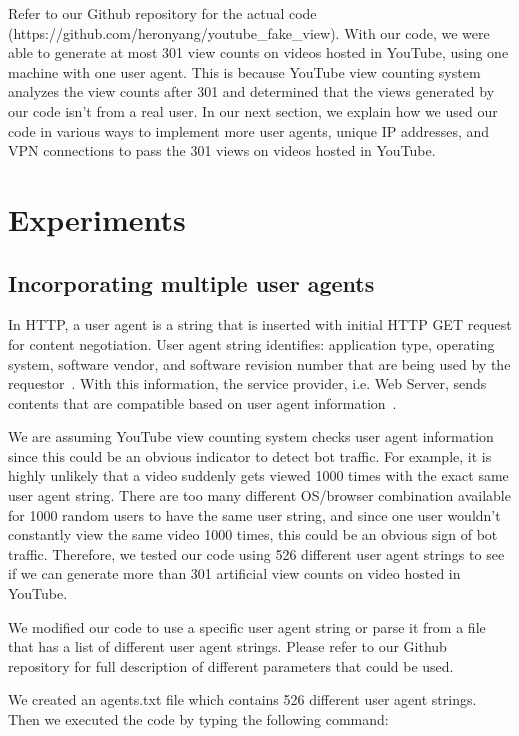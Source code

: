 \documentclass[conference]{IEEEtran}
\begin{document}
Refer to our Github repository for the actual code (https://github.com/heronyang/youtube\_fake\_view). With our code, we were able to generate at most 301 view counts on videos hosted in YouTube, using one machine with one user agent. This is because YouTube view counting system analyzes the view counts after 301 and determined that the views generated by our code isn't from a real user. In our next section, we explain how we used our code in various ways to implement more user agents, unique IP addresses, and VPN connections to pass the 301 views on videos hosted in YouTube.

\section{Experiments}

\subsection{Incorporating multiple user agents}

In HTTP, a user agent is a string that is inserted with initial HTTP GET request for content negotiation. User agent string identifies: application type, operating system, software vendor, and software revision number that are being used by the requestor~\cite{c16}. With this information, the service provider, i.e. Web Server, sends contents that are compatible based on user agent information~\cite{c16}.

We are assuming YouTube view counting system checks user agent information since this could be an obvious indicator to detect bot traffic. For example, it is highly unlikely that a video suddenly gets viewed 1000 times with the exact same user agent string. There are too many different OS/browser combination available for 1000 random users to have the same user string, and since one user wouldn't constantly view the same video 1000 times, this could be an obvious sign of bot traffic. Therefore, we tested our code using 526 different user agent strings to see if we can generate more than 301 artificial view counts on video hosted in YouTube.

We modified our code to use a specific user agent string or parse it from a file that has a list of different user agent strings. Please refer to our Github repository for full description of different parameters that could be used.

We created an agents.txt file which contains 526 different user agent strings. Then we executed the code by typing the following command:
\end{document}

